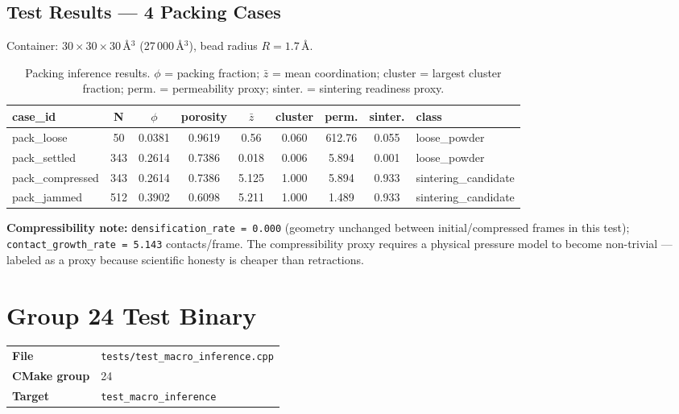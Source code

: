 \documentclass[11pt,a4paper]{article}
\begin{document}
\subsection{Test Results --- 4 Packing Cases}

Container: $30 \times 30 \times 30$\,\AA$^3$ (27\,000\,\AA$^3$), bead radius $R = 1.7$\,\AA.

\begin{table}[h!]
\centering
\small
\begin{tabular}{lcccccccl}
\toprule
\textbf{case\_id} & \textbf{N} & \textbf{$\phi$} & \textbf{porosity} & \textbf{$\bar{z}$} & \textbf{cluster} & \textbf{perm.} & \textbf{sinter.} & \textbf{class} \\
\midrule
pack\_loose      &  50 & 0.0381 & 0.9619 & 0.56  & 0.060 & 612.76 & 0.055 & loose\_powder \\
pack\_settled    & 343 & 0.2614 & 0.7386 & 0.018 & 0.006 & 5.894  & 0.001 & loose\_powder \\
pack\_compressed & 343 & 0.2614 & 0.7386 & 5.125 & 1.000 & 5.894  & 0.933 & sintering\_candidate \\
pack\_jammed     & 512 & 0.3902 & 0.6098 & 5.211 & 1.000 & 1.489  & 0.933 & sintering\_candidate \\
\bottomrule
\end{tabular}
\caption{Packing inference results. $\phi$ = packing fraction; $\bar{z}$ = mean coordination; cluster = largest cluster fraction; perm. = permeability proxy; sinter. = sintering readiness proxy.}
\end{table}

\textbf{Compressibility note:} \texttt{densification\_rate = 0.000} (geometry unchanged
between initial/compressed frames in this test); \texttt{contact\_growth\_rate = 5.143}
contacts/frame. The compressibility proxy requires a physical pressure model to become
non-trivial --- labeled as a proxy because scientific honesty is cheaper than retractions.

\section{Group 24 Test Binary}

\begin{tabular}{ll}
\textbf{File}        & \texttt{tests/test\_macro\_inference.cpp} \\
\textbf{CMake group} & 24 \\
\textbf{Target}      & \texttt{test\_macro\_inference} \\
\end{tabular}
\end{document}
